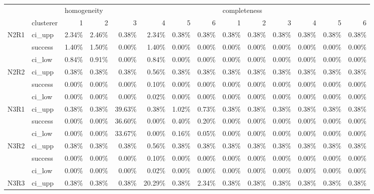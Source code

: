 \begin{tabular}{llrrrrrrrrrrrr}
\toprule
     & {} & \multicolumn{6}{l}{homogeneity} & \multicolumn{6}{l}{completeness} \\
     & clusterer &           1 &     2 &      3 &      4 &      5 &      6 &            1 &     2 &     3 &     4 &     5 &     6 \\
\midrule
N2R1 & ci\_upp &       2.34\% & 2.46\% &  0.38\% &  2.34\% &  0.38\% &  0.38\% &        0.38\% & 0.38\% & 0.38\% & 0.38\% & 0.38\% & 0.38\% \\
     & success &       1.40\% & 1.50\% &  0.00\% &  1.40\% &  0.00\% &  0.00\% &        0.00\% & 0.00\% & 0.00\% & 0.00\% & 0.00\% & 0.00\% \\
     & ci\_low &       0.84\% & 0.91\% &  0.00\% &  0.84\% &  0.00\% &  0.00\% &        0.00\% & 0.00\% & 0.00\% & 0.00\% & 0.00\% & 0.00\% \\
N2R2 & ci\_upp &       0.38\% & 0.38\% &  0.38\% &  0.56\% &  0.38\% &  0.38\% &        0.38\% & 0.38\% & 0.38\% & 0.38\% & 0.38\% & 0.38\% \\
     & success &       0.00\% & 0.00\% &  0.00\% &  0.10\% &  0.00\% &  0.00\% &        0.00\% & 0.00\% & 0.00\% & 0.00\% & 0.00\% & 0.00\% \\
     & ci\_low &       0.00\% & 0.00\% &  0.00\% &  0.02\% &  0.00\% &  0.00\% &        0.00\% & 0.00\% & 0.00\% & 0.00\% & 0.00\% & 0.00\% \\
N3R1 & ci\_upp &       0.38\% & 0.38\% & 39.63\% &  0.38\% &  1.02\% &  0.73\% &        0.38\% & 0.38\% & 0.38\% & 0.38\% & 0.38\% & 0.38\% \\
     & success &       0.00\% & 0.00\% & 36.60\% &  0.00\% &  0.40\% &  0.20\% &        0.00\% & 0.00\% & 0.00\% & 0.00\% & 0.00\% & 0.00\% \\
     & ci\_low &       0.00\% & 0.00\% & 33.67\% &  0.00\% &  0.16\% &  0.05\% &        0.00\% & 0.00\% & 0.00\% & 0.00\% & 0.00\% & 0.00\% \\
N3R2 & ci\_upp &       0.38\% & 0.38\% &  0.38\% &  0.56\% &  0.38\% &  0.38\% &        0.38\% & 0.38\% & 0.38\% & 0.38\% & 0.38\% & 0.38\% \\
     & success &       0.00\% & 0.00\% &  0.00\% &  0.10\% &  0.00\% &  0.00\% &        0.00\% & 0.00\% & 0.00\% & 0.00\% & 0.00\% & 0.00\% \\
     & ci\_low &       0.00\% & 0.00\% &  0.00\% &  0.02\% &  0.00\% &  0.00\% &        0.00\% & 0.00\% & 0.00\% & 0.00\% & 0.00\% & 0.00\% \\
N3R3 & ci\_upp &       0.38\% & 0.38\% &  0.38\% & 20.29\% &  0.38\% &  2.34\% &        0.38\% & 0.38\% & 0.38\% & 0.38\% & 0.38\% & 0.38\% \\

\end{tabular}
